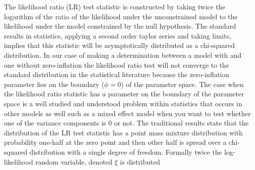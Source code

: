 \documentclass{article}
\begin{document}
The likelihood ratio (LR) test statistic is constructed by taking twice the logarithm of the ratio of the likelihood under the unconstrained model to the likelihood under the model constrained by the null hypothesis. The standard results in statistics, applying a second order taylor series and taking limits, implies that this statistic will be asymptotically distributed as a chi-squared distribution. In our case of making a determination between a model with and one without zero-inflation the likelihood ratio test will not converge to the standard distribution in the statistical literature because the zero-inflation parameter lies on the boundary ($\phi=0$) of the parameter space. The case when the likelihood ratio statistic has a parameter on the boundary of the parameter space is a well studied and understood problem within statistics that occurs in other models as well such as a mixed effect model when you want to test whether one of the variance components is 0 or not. The traditional results state that the distribution of the LR test statistic has a point mass mixture distribution with probability one-half at the zero point and then other half is spread over a chi-squared distribution with a single degree of freedom. Formally twice the log-likelihood random variable, denoted $\xi$ is distributed 
\end{document}

